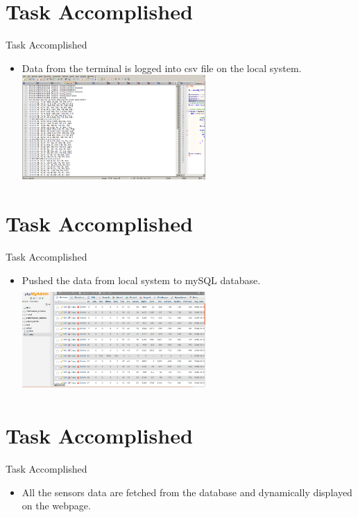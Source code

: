 \documentclass[10pt, a4paper]{beamer}
\begin{document}
\section{Task Accomplished}
\begin{frame}{Task Accomplished}
	\begin{itemize}
	  \item Data from the terminal is logged into csv file on the local system. \\
	  \includegraphics[width=7cm, height=4cm]{notepaddatacsv.png}
	\end{itemize}
\end{frame}

\section{Task Accomplished}
\begin{frame}{Task Accomplished}
	\begin{itemize}
	  \item  Pushed the data from local system to mySQL database.\\
	  \includegraphics[width=7cm, height=4cm]{database.png}
	\end{itemize}
\end{frame}

\section{Task Accomplished}
\begin{frame}{Task Accomplished}
	\begin{itemize}
	  \item All the sensors data are fetched from the database and dynamically displayed on the webpage.\\
	\end{itemize}
\end{frame}
\end{document}
